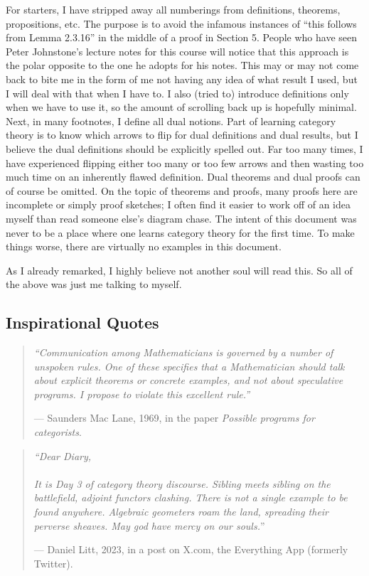 \documentclass[a4paper,11pt]{article}
\theoremstyle{break_italics}
\theoremstyle{break_upright}
\theoremstyle{remark}
\begin{document}
For starters, I have stripped away all numberings from definitions, theorems, propositions, etc. The purpose is to avoid the infamous instances of ``this follows from Lemma 2.3.16'' in the middle of a proof in Section 5. People who have seen Peter Johnstone's lecture notes for this course will notice that this approach is the polar opposite to the one he adopts for his notes. This may or may not come back to bite me in the form of me not having any idea of what result I used, but I will deal with that when I have to. I also (tried to) introduce definitions only when we have to use it, so the amount of scrolling back up is hopefully minimal. Next, in many footnotes, I define all dual notions. Part of learning category theory is to know which arrows to flip for dual definitions and dual results, but I believe the dual definitions should be explicitly spelled out. Far too many times, I have experienced flipping either too many or too few arrows and then wasting too much time on an inherently flawed definition. Dual theorems and dual proofs can of course be omitted. On the topic of theorems and proofs, many proofs here are incomplete or simply proof sketches; I often find it easier to work off of an idea myself than read someone else's diagram chase. The intent of this document was never to be a place where one learns category theory for the first time. To make things worse, there are virtually no examples in this document.

As I already remarked, I highly believe not another soul will read this. So all of the above was just me talking to myself.

\subsection{Inspirational Quotes}

\begin{quote}
\textit{``Communication among Mathematicians is governed by a number of unspoken rules. One of these specifies that a Mathematician should talk about explicit theorems or concrete examples, and not about speculative programs. I propose to violate this excellent rule.''} 

--- Saunders Mac Lane, 1969, in the paper \textit{Possible programs for categorists}.
\end{quote}

\begin{quote}
\textit{``Dear Diary, \\
\\
 It is Day 3 of category theory discourse. Sibling meets sibling on the battlefield, adjoint functors clashing. There is not a single example to be found anywhere. Algebraic geometers roam the land, spreading their perverse sheaves. May god have mercy on our souls.}'' 
 
 --- Daniel Litt, 2023, in a post on X.com, the Everything App (formerly Twitter).
\end{quote}
\end{document}
